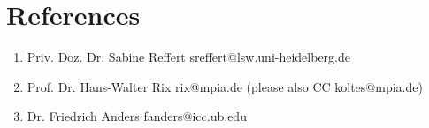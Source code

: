 \section*{References}

\begin{enumerate}
    \item Priv. Doz. Dr. Sabine Reffert \hfill sreffert@lsw.uni-heidelberg.de
    \item Prof. Dr. Hans-Walter Rix \hfill rix@mpia.de (please also CC koltes@mpia.de)
    \item Dr. Friedrich Anders \hfill fanders@icc.ub.edu
\end{enumerate}